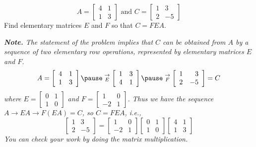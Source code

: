 \documentclass[pdf
,handout
]{beamer}
\begin{document}
{{{{\begin{problem}
\[ A=\left[\begin{array}{rr}
4 & 1 \\ 1 & 3 \end{array}\right]
\mbox{ and }
C=\left[\begin{array}{rr}
1 & 3 \\ 2 & -5 \end{array}\right] \]
Find elementary matrices $E$ and $F$ so that 
$C=FEA$.
\end{problem}
\pause
\begin{solution}\em
{\bf Note.}
The statement of the problem implies that \alert{$C$ can be
obtained from $A$ by a sequence of two elementary row 
operations}, represented by elementary matrices $E$ and $F$.
\pause
\[
A = \left[\begin{array}{rr}
4 & 1 \\ 1 & 3 
\end{array}\right]
\pause
\stackrel{\rightarrow}{_E}
\left[\begin{array}{rr}
1 & 3 \\
4 & 1 
\end{array}\right]
\pause
\stackrel{\rightarrow}{_F}
\left[\begin{array}{rr}
1 & 3 \\
2 & -5 
\end{array}\right] = C 
\]
\pause
where
$E=\left[\begin{array}{rr}
0 & 1 \\ 1 & 0 \end{array}\right]$
\pause
and $F=\left[\begin{array}{rr}
1 & 0 \\ -2 & 1 \end{array}\right]$.
\pause
Thus we have the sequence
$A\rightarrow EA \rightarrow F(EA)=C$,
\pause
so $C=FEA$, i.e.,
\[ \left[\begin{array}{rr} 1 & 3 \\ 2 & -5 \end{array}\right]
=
\left[\begin{array}{rr}
1 & 0 \\ -2 & 1 \end{array}\right]
\left[\begin{array}{rr}
0 & 1 \\ 1 & 0 \end{array}\right]
\left[\begin{array}{rr}
4 & 1 \\ 1 & 3 
\end{array}\right] \]
\pause
\alert{You can check your work by doing the matrix multiplication.}
\end{solution}
}}


}}
\end{document}

